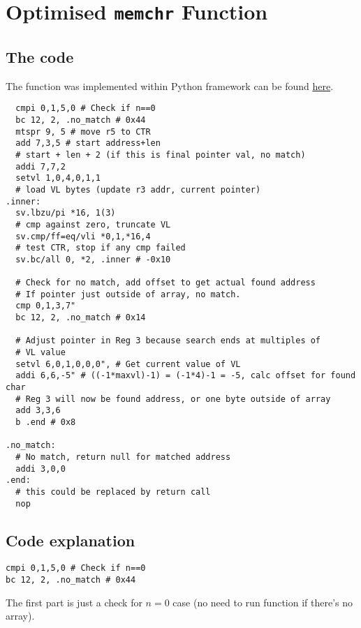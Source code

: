 %

\section{Optimised \texttt{memchr} Function}

\subsection{The code}

The function was implemented within Python framework can be found
\href{https://github.com/ngisearchsvp64/glibc-svp64/blob/master/svp64-port/experimentation/test_memchr.py}{here}.
\begin{verbatim}
  cmpi 0,1,5,0 # Check if n==0
  bc 12, 2, .no_match # 0x44
  mtspr 9, 5 # move r5 to CTR
  add 7,3,5 # start address+len
  # start + len + 2 (if this is final pointer val, no match)
  addi 7,7,2
  setvl 1,0,4,0,1,1
  # load VL bytes (update r3 addr, current pointer)
.inner:
  sv.lbzu/pi *16, 1(3)
  # cmp against zero, truncate VL
  sv.cmp/ff=eq/vli *0,1,*16,4
  # test CTR, stop if any cmp failed
  sv.bc/all 0, *2, .inner # -0x10

  # Check for no match, add offset to get actual found address
  # If pointer just outside of array, no match.
  cmp 0,1,3,7"
  bc 12, 2, .no_match # 0x14

  # Adjust pointer in Reg 3 because search ends at multiples of
  # VL value
  setvl 6,0,1,0,0,0", # Get current value of VL
  addi 6,6,-5" # ((-1*maxvl)-1) = (-1*4)-1 = -5, calc offset for found char
  # Reg 3 will now be found address, or one byte outside of array
  add 3,3,6
  b .end # 0x8

.no_match:
  # No match, return null for matched address
  addi 3,0,0
.end:
  # this could be replaced by return call
  nop
\end{verbatim}

\subsection{Code explanation}
\begin{verbatim}
cmpi 0,1,5,0 # Check if n==0
bc 12, 2, .no_match # 0x44
\end{verbatim}
The first part is just a check for $n=0$ case (no need to run function if
there's no array).

